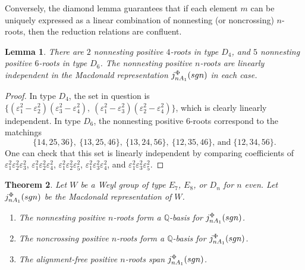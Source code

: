 \documentclass[11pt]{amsart}
\theoremstyle{plain}
\newtheorem{theorem}{Theorem}[section]
\newtheorem{lemma}[theorem]{Lemma}
\theoremstyle{definition}
\theoremstyle{remark}
\numberwithin{equation}{subsection}
\newcommand{\ep}{\varepsilon}
\newcommand{\Q}{{\mathbb Q}}
\newcommand{\macd}[2]{j^{#1}_{#2}({\rm{sgn}})}
\begin{document}
Conversely, the diamond lemma guarantees that if each element $m$ can be
uniquely expressed as a linear combination of nonnesting (or noncrossing)
$n$-roots, then the reduction relations are confluent.

\begin{lemma}\label{lem:d4d6}
There are $2$ nonnesting positive $4$-roots in type $D_4$, and $5$ nonnesting
positive $6$-roots in type $D_6$.  The nonnesting positive $n$-roots are
linearly independent in the Macdonald representation $\macd{\Phi}{nA_1}$ in each case.
\end{lemma}

\begin{proof}
In type $D_4$, the set in question is $\{(\ep_1^2-\ep_2^2)(\ep_3^2-\ep_4^2),\
(\ep_1^2-\ep_3^2)(\ep_2^2-\ep_4^2)\}$, which is clearly linearly independent.
In type $D_6$, the nonnesting positive $6$-roots correspond to the  matchings $$
\{14, 25, 36\}, \ \{13, 25, 46\}, \ \{13, 24, 56\}, \ \{12, 35, 46\},
\,\text{and}\; \{12, 34, 56\}.$$ One can check that this set is linearly
independent by comparing coefficients of $\ep_1^2 \ep_2^2 \ep_3^2$, $\ep_1^2
\ep_2^2 \ep_4^2$, $\ep_1^2 \ep_2^2 \ep_5^2$, $\ep_1^2 \ep_3^2 \ep_4^2$, and
$\ep_1^2 \ep_3^2 \ep_5^2$.
\end{proof}

\begin{theorem}\label{thm:indep}
Let $W$ be a Weyl group of type $E_7$, $E_8$, or $D_n$ for $n$ even. Let
$\macd{\Phi}{nA_1}$ be the Macdonald representation of $W$.
\begin{enumerate}
    \item[{\rm (i)}]{The nonnesting positive $n$-roots form a $\Q$-basis for
     $\macd{\Phi}{nA_1}$.}
 \item[{\rm (ii)}]{The noncrossing positive $n$-roots form a $\Q$-basis for
     $\macd{\Phi}{nA_1}$.}
 \item[{\rm (iii)}]{The alignment-free positive $n$-roots span
     $\macd{\Phi}{nA_1}$.}
\end{enumerate}
\end{theorem}
\end{document}
